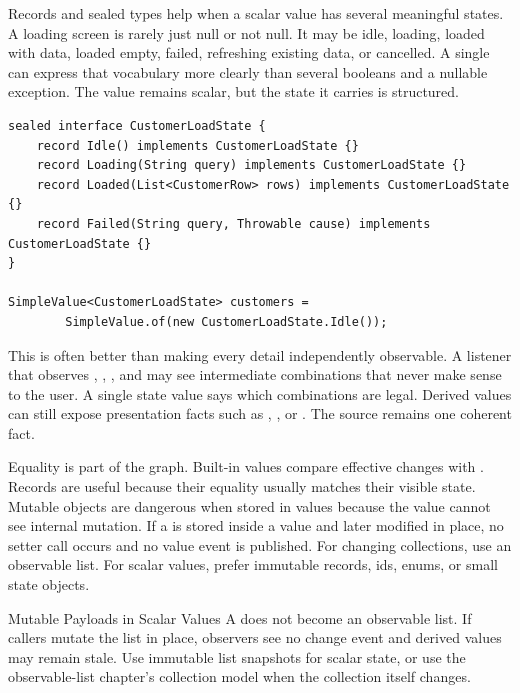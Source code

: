 Records and sealed types help when a scalar value has several meaningful states.
A loading screen is rarely just null or not null. It may be idle, loading,
loaded with data, loaded empty, failed, refreshing existing data, or cancelled.
A single  can express that vocabulary more clearly
than several booleans and a nullable exception. The value remains scalar, but the
state it carries is structured.

\begin{lstlisting}[caption={A scalar value can carry a structured state.}]
sealed interface CustomerLoadState {
    record Idle() implements CustomerLoadState {}
    record Loading(String query) implements CustomerLoadState {}
    record Loaded(List<CustomerRow> rows) implements CustomerLoadState {}
    record Failed(String query, Throwable cause) implements CustomerLoadState {}
}

SimpleValue<CustomerLoadState> customers =
        SimpleValue.of(new CustomerLoadState.Idle());
\end{lstlisting}

This is often better than making every detail independently observable. A
listener that observes , , , and 
may see intermediate combinations that never make sense to the user. A single
state value says which combinations are legal. Derived values can still expose
presentation facts such as , , or
. The source remains one coherent fact.

Equality is part of the graph. Built-in values compare effective changes with
. Records are useful because their equality usually matches
their visible state. Mutable objects are dangerous when stored in values because
the value cannot see internal mutation. If a  is stored inside a
value and later modified in place, no setter call occurs and no value event is
published. For changing collections, use an observable list. For scalar values,
prefer immutable records, ids, enums, or small state objects.

\begin{pitfallbox}{Mutable Payloads in Scalar Values}
A  does not become an observable list. If callers
mutate the list in place, observers see no change event and derived values may
remain stale. Use immutable list snapshots for scalar state, or use the
observable-list chapter's collection model when the collection itself changes.
\end{pitfallbox}

